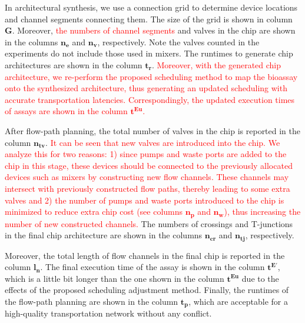 In architectural synthesis, we use a connection grid to determine device locations and channel segments connecting them. The size of the grid is shown in column $\boldsymbol{G}$. Moreover, \textcolor{red}{the numbers of
channel segments} and valves in the chip are shown in the columns $\boldsymbol{n_e}$ and $\boldsymbol{n_v}$, respectively. Note the valves counted in the experiments do not include those used in mixers. The runtimes to generate chip architectures are shown in the column $\boldsymbol{t_r}$.
\textcolor{red}{Moreover, with the generated chip architecture, we re-perform the proposed scheduling method to map the bioassay onto the synthesized architecture, thus generating an updated scheduling with accurate transportation latencies. Correspondingly, the updated execution times of assays are shown in the column $\boldsymbol{t^{Eu}}$.}

After flow-path planning, the total number of valves in the chip is reported in the column $\boldsymbol{n_{tv}}$.
\textcolor{red}{It can be seen that new valves are introduced into the chip. We analyze this for two reasons: 1) since pumps and waste ports are added to the chip in this stage, these devices should be connected to the previously allocated devices such as mixers by constructing new flow channels. These channels may intersect with previously constructed flow paths, thereby leading to some extra valves and 2) the number of pumps and waste ports introduced to the chip is minimized to reduce extra chip cost (see columns $\boldsymbol{n_p}$ and $\boldsymbol{n_w}$), thus increasing the number of new constructed channels.}
The numbers of crossings and T-junctions in the final chip architecture are shown in the columns $\boldsymbol{n_{cr}}$ and $\boldsymbol{n_{tj}}$, respectively.

Moreover, the total length of flow channels in the final chip is reported in the column $\boldsymbol{l_n}$.
The final execution time of the assay is shown in the column $\boldsymbol{t^{E'}}$, which is a little bit longer than the one shown in the column $\boldsymbol{t^{Eu}}$ due to the effects of the proposed scheduling adjustment method. Finally, the runtimes of the flow-path planning are shown in the column $\boldsymbol{t_p}$, which are acceptable for a high-quality transportation network without any conflict.


